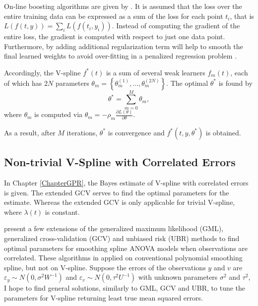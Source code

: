 On-line boosting algorithms are given by \cite{babenko2009family, beygelzimer2015online}. It is assumed that the loss over the entire training data can be expressed as a sum of the loss for each point $t_i$, that is $L(f(t,y))=\sum_i L(f(t_i,y_i))$. Instead of computing the gradient of the entire loss, the gradient is computed with respect to just one data point. Furthermore, by adding additional regularization term will help to smooth the final learned weights to avoid over-fitting in a penalized regression problem \citep{chen2016xgboost}. 

Accordingly, the V-spline $f^*(t)$ is a sum of several weak learners $f_m(t)$, each of which has $2N$ parameters $\theta_m=\left\lbrace \theta_m^{(1)},\ldots,\theta_m^{(2N)}\right\rbrace$. The optimal $\theta^*$ is found by 
\begin{equation*}
\theta^*=\sum_{m=0}^{M}\theta_m,
\end{equation*}
where $\theta_m$ is computed via $\theta_m=-\rho_m\frac{\partial L(\theta)}{\partial \theta}$. 

As a result, after $M$ iterations, $\theta^*$ is convergence and $f^*(t,y,\theta^*)$ is obtained. 



\subsection*{Non-trivial V-Spline with Correlated Errors}

In Chapter \ref{ChapterGPR}, the Bayes estimate of V-spline with correlated errors is given. The extended GCV serves to find the optimal parameters for the estimate. Whereas the extended GCV is only applicable for trivial V-spline, where $\lambda(t)$ is constant. 


\cite{opsomer2001nonparametric, wang1998smoothing} present a few extensions of the generalized maximum likelihood (GML), generalized cross-validation (GCV) and unbiased risk (UBR) methods to find optimal parameters for smoothing spline ANOVA models when observations are correlated. These algorithms in applied on conventional polynomial smoothing spline, but not on V-spline. Suppose the errors of the observations $y$ and $v$ are $\varepsilon_y\sim N\left(0,\sigma^2W^{-1}\right)$ and $\varepsilon_v\sim N\left(0,\tau^2U^{-1}\right)$ with unknown parameters $\sigma^2$ and $\tau^2$, I hope to find general solutions, similarly to GML, GCV and UBR, to tune the parameters for V-spline returning least true mean squared errors. 




